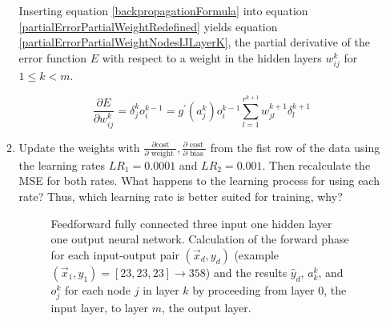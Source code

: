 \documentclass[main.tex]{subfiles}
\begin{document}
\begin{enumerate}
\begin{enumerate}
        Inserting equation \ref{backpropagationFormula} into equation \ref{partialErrorPartialWeightRedefined} yields equation \ref{partialErrorPartialWeightNodesIJLayerK}, the partial derivative of the error function $E$ with respect to a weight in the hidden layers $w_{ij}^{k}$ for $1 \leq k < m$.
    
        \begin{equation}\label{partialErrorPartialWeightNodesIJLayerK}
        \frac{\partial E}{\partial w_{i j}^{k}}=\delta_{j}^{k} o_{i}^{k-1}=g^{\prime}\left(a_{j}^{k}\right) o_{i}^{k-1} \sum_{l=1}^{r^{k+1}} w_{j l}^{k+1} \delta_{l}^{k+1}
        \end{equation}
    
        \item Update the weights with $\frac{\partial \text{cost}}{\partial \text { weight }}, \frac{\partial \text { cost }}{\partial \text { bias }}$ from the fist row of the data using the learning rates $LR_1 = 0.0001$ and $LR_2 = 0.001$. Then recalculate the MSE for both rates. What happens to the learning process for using each rate? Thus, which learning rate is better suited for training, why? 
        
        \begin{figure}
        \centering{}
        \caption{Feedforward fully connected three input one hidden layer one output neural network. Calculation of the forward phase for each input-output pair $\left(\vec{x}_{d}, y_{d}\right)$ (example $\left(\vec{x}_{1}, y_{1}\right) = [23,23,23] \rightarrow 358$) and the results $\hat{y}_d$, $a_k^k$, and $o_{j}^{k}$ for each node $j$ in layer $k$ by proceeding from layer 0, the input layer, to layer $m$, the output layer.}
        \label{fig:nueral network architecture}
        \end{figure}
        

\end{enumerate}
\end{enumerate}
\end{document}
